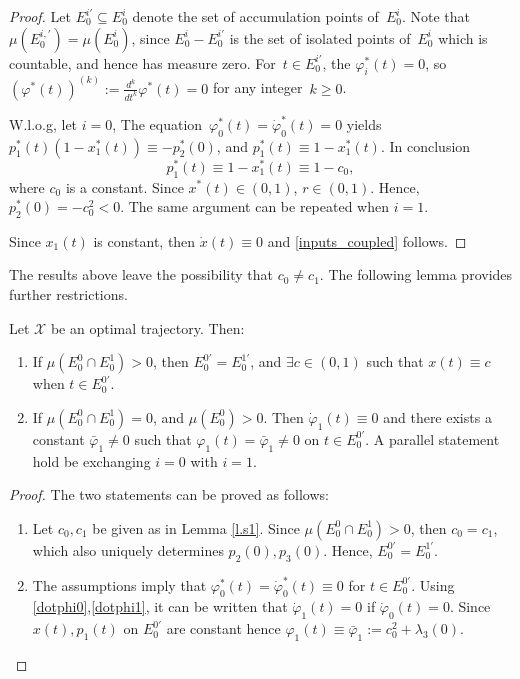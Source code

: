 \begin{proof}
	Let $ E_0^{i'} \subseteq E_0^i$ denote  the set of accumulation points of~$E_0^{i}$.
	Note that~$\mu(E_0^{i,'})=\mu(E_0^i)$, since $E_0^{i}-E_0^{i'}$ is the set of isolated points of~$E_0^i$ which is countable, and hence has measure zero. 
	For~$t\in E_0^{i'}$, the $\varphi_i^*(t)=0$, so~$(\varphi^*(t) )^{(k)}:= \frac{d^k}{dt^k} \varphi^*(t) =0$ for any integer~$k\geq 0$. 
	
	W.l.o.g, let $i=0$, The equation~$\varphi_0^*(t)=\dot\varphi_0^*(t)=0$ yields~$p_1^*(t) (1-x_1^*(t)) \equiv -p_2^*(0)$, and $p_1^*(t) \equiv 1-x_1^*(t)$. 
	In conclusion
	\begin{equation} \label{eq:xqpo2}
	p_1^*(t)\equiv 1-x_1^*(t) \equiv 1- c_0 , 
	\end{equation}
	where $c_0$ is a constant. Since $x^*(t)\in (0,1)$,  $r\in (0,1)$. 
	Hence, $p_2^*(0) = -c_0^2 <0$. 
	The same argument can be repeated when $i=1$.
	
	Since $x_1(t)$ is constant, then $\dot x(t) \equiv 0$ and \eqref{inputs_coupled} follows.
\end{proof}

The results above leave the possibility that $c_0 \ne c_1$. 
The following lemma provides further restrictions. 

\begin{lemma}\label{l.s2}
	Let $\mathscr X$ be an optimal trajectory. Then:
	\begin{enumerate}
		\item If $\mu(E_0^0 \cap E_0^1) > 0$, then $E_0^{0'}=E_0^{1'}$, and $\exists c \in (0,1)$ such that $x(t)\equiv c$ when $t\in E_0^{0'}$.
		\item	If $\mu(E_0^0 \cap E_0^1) =0$, and $\mu(E_0^0)>0$. Then $\dot \varphi_1(t)\equiv  0$ and there exists a constant $\bar\varphi_1 \ne 0$ such that $\varphi_1(t)=\bar\varphi_1 \ne 0$ on $t \in E_0^{0'}$. A parallel statement hold be exchanging $i=0$ with $i=1$.
	\end{enumerate}
\end{lemma}
\begin{proof}The two statements can be proved as follows:
	\begin{enumerate}
		\item Let $c_0, c_1$ be given as in Lemma \ref{l.s1}. Since $\mu(E_0^0 \cap E_0^1) > 0$, then $c_0=c_1$, which also uniquely determines $p_2(0),p_3(0)$. 
		Hence, $E_0^{0'}=E_0^{1'}$.
		\item The assumptions imply that $\varphi_0^*(t)=\dot\varphi_0^*(t)\equiv0$ for $ t \in E_0^{0'}$. 
		Using \eqref{dotphi0},\eqref{dotphi1}, it can be written that $\dot\varphi_1(t)=0$ if $\dot\varphi_0(t)=0$. 
		Since $x(t), p_1(t)$ on $E_0^{0'}$ are constant hence $\varphi_1(t)\equiv \bar\varphi_1 := c_0^2 +\lambda_3(0)$.
	\end{enumerate}
\end{proof}


